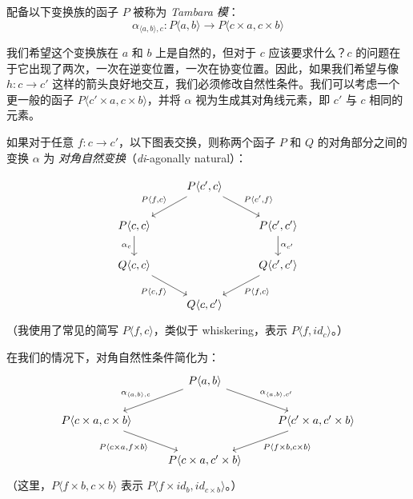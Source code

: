 \documentclass[DaoFP]{subfiles}
\begin{document}
配备以下变换族的函子 $P$ 被称为 \emph{Tambara 模}：
\[ \alpha_{\langle a, b\rangle, c} \colon P \langle a, b \rangle \to P \langle c \times a, c \times b \rangle \]

我们希望这个变换族在 $a$ 和 $b$ 上是自然的，但对于 $c$ 应该要求什么？$c$ 的问题在于它出现了两次，一次在逆变位置，一次在协变位置。因此，如果我们希望与像 $h \colon c \to c'$ 这样的箭头良好地交互，我们必须修改自然性条件。我们可以考虑一个更一般的函子 $P \langle c' \times a, c \times b \rangle$，并将 $\alpha$ 视为生成其对角线元素，即 $c'$ 与 $c$ 相同的元素。

如果对于任意 $f \colon c \to c'$，以下图表交换，则称两个函子 $P$ 和 $Q$ 的对角部分之间的变换 $\alpha$ 为 \emph{对角自然变换}（\emph{di}-agonally natural）：

\[
 \begin{tikzcd}
 & P \langle c', c \rangle
 \arrow[dl, "{P \langle f, c \rangle}"']
 \arrow[dr, "{P \langle c', f \rangle}"]
 \\
 P \langle c, c \rangle 
  \arrow[d, "\alpha_c"']
 && P \langle c', c' \rangle
 \arrow[d, "\alpha_{c'}"]
 \\
 Q \langle c, c \rangle
   \arrow[dr, "{P \langle c, f \rangle}"']
 &&  Q \langle c', c' \rangle
 \arrow[dl,"{P \langle f, c \rangle}"]
\\
&Q \langle c, c' \rangle
 \end{tikzcd}
\]
（我使用了常见的简写 $P \langle f, c \rangle$，类似于 whiskering，表示 $P \langle f, id_c \rangle$。）

在我们的情况下，对角自然性条件简化为：
\[
 \begin{tikzcd}
 & P \langle a, b \rangle
 \arrow[dl, "{\alpha_{\langle a, b \rangle, c}}"']
 \arrow[dr, "{\alpha_{\langle a, b \rangle, c'}}"]
 \\
 P \langle c \times a, c \times b \rangle
   \arrow[dr, "{P \langle c \times a, f \times b \rangle}"']
 &&  P \langle c' \times a, c'  \times b\rangle
 \arrow[dl,"{P \langle f \times b, c \times b \rangle}"]
\\
&P \langle c \times a, c' \times b \rangle
 \end{tikzcd}
\]
（这里，$P \langle f \times b, c \times b \rangle$ 表示 $P \langle f \times id_b, id_{c \times b} \rangle$。）
\end{document}

